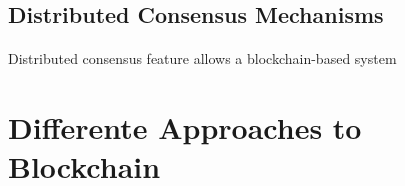 \subsection*{Distributed Consensus Mechanisms}\label{subsec:distributed-consensus-mechanisms}
\paragraph{}

Distributed consensus feature allows a blockchain-based system


\section{Differente Approaches to Blockchain}\label{sec:different-approaches-to-blockchain}
\paragraph{}




